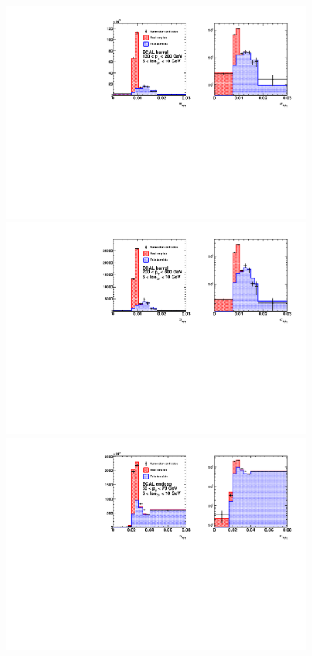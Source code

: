 \begin{figure}[!htbp]
\begin{multicols}{2}
		\includegraphics[scale=0.41]{figures/closure_test_h_pt130To200_chIso5To10_EB_Fake_sieie.pdf} \\
		\includegraphics[scale=0.41]{figures/closure_test_h_pt200To600_chIso5To10_EB_Fake_sieie.pdf} \\
		\includegraphics[scale=0.41]{figures/closure_test_h_pt50To70_chIso5To10_EE_Fake_sieie.pdf} \\

\end{multicols}
\end{figure}
